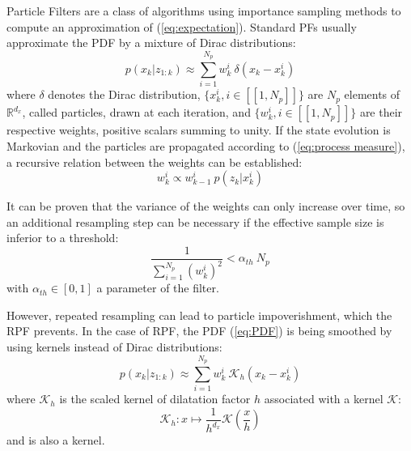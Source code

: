 \documentclass[conference]{IEEEtran}
\begin{document}
Particle Filters \cite{bib:tutorial} are a class of algorithms using importance sampling methods to compute an approximation of (\ref{eq:expectation}). Standard PFs usually approximate the PDF by a mixture of Dirac distributions:
\begin{equation}
p(x_k|z_{1:k}) \approx \sum_{i=1}^{N_p} w_k^i \: \delta\left(x_k - x_k^i\right) \label{eq:PDF}
\end{equation}
where $\delta$ denotes the Dirac distribution, $\{x_k^i, i \in [\![1, N_p]\!]\}$ are $N_p$ elements of $\mathbb{R}^{d_x}$, called particles, drawn at each iteration, and $\{w_k^i, i \in [\![1, N_p]\!]\}$ are their respective weights, positive scalars summing to unity.  If the state evolution is Markovian and the particles are propagated according to (\ref{eq:process measure}), a recursive relation between the weights can be established:
\begin{equation}
w_k^i \propto w_{k-1}^i \: p\left(z_k|x_k^i\right)\label{eq:w recursive}
\end{equation}

It can be proven \cite{bib:weight variance} that the variance of the weights can only increase over time, so an additional resampling step can be necessary if the effective sample size is inferior to a threshold:
\begin{equation}
\frac{1}{\sum_{i=1}^{N_p}\left(w_k^i\right)^2} <  \alpha_{th} \: N_p \label{eq:resampling}
\end{equation}
with $\alpha_{th} \in [0, 1]$ a parameter of the filter.

However, repeated resampling can lead to particle impoverishment, which the RPF prevents. In the case of RPF, the PDF (\ref{eq:PDF}) is being smoothed by using kernels instead of Dirac distributions:
\begin{equation}
p(x_k|z_{1:k}) \approx \sum_{i=1}^{N_p} w_k^i \: \mathcal{K}_h\left(x_k - x_k^i\right)
\end{equation}
where $\mathcal{K}_h$ is the scaled kernel of dilatation factor $h$ associated with a kernel $\mathcal{K}$:
\begin{equation}
\mathcal{K}_h : x \mapsto \frac{1}{h^{d_x}} \mathcal{K}\left(\frac{x}{h}\right)
\end{equation}
and is also a kernel.
\end{document}
